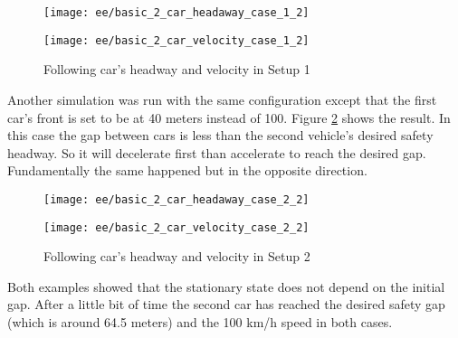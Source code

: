 		\begin{figure}[ht]
			\centering
			\begin{minipage}{.5\textwidth}
				\centering
				\texttt{[image: ee/basic\_2\_car\_headaway\_case\_1\_2]}
			\end{minipage}\hfill
			\begin{minipage}{.5\textwidth}
				\centering
				\texttt{[image: ee/basic\_2\_car\_velocity\_case\_1\_2]}
			\end{minipage}
			\caption{Following car's headway and velocity in Setup 1}
			\label{fig:basic2car_case_1}
		\end{figure}

		Another simulation was run with the same configuration except that the first car's front is set to be at 40 meters instead of 100. Figure \ref{fig:basic2car_case_2} shows the result. In this case the gap between cars is less than the second vehicle's desired safety headway. So it will decelerate first than accelerate to reach the desired gap. Fundamentally the same happened but in the opposite direction.
		\begin{figure}[ht]
			\centering
			\begin{minipage}{.5\textwidth}
				\centering
				\texttt{[image: ee/basic\_2\_car\_headaway\_case\_2\_2]}
			\end{minipage}\hfill
			\begin{minipage}{.5\textwidth}
				\centering
				\texttt{[image: ee/basic\_2\_car\_velocity\_case\_2\_2]}
			\end{minipage}
			\caption{Following car's headway and velocity in Setup 2}
			\label{fig:basic2car_case_2}
		\end{figure}
		Both examples showed that the stationary state does not depend on the initial gap. After a little bit of time the second car has reached the desired safety gap (which is around 64.5 meters) and the 100 km/h speed in both cases.
